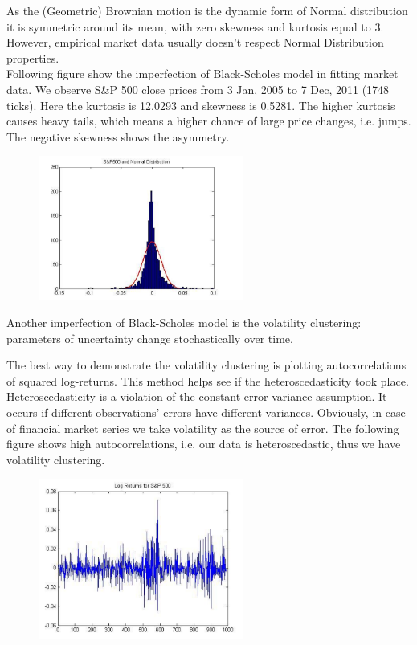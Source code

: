 \documentclass[a4paper]{report}
\begin{document}
\begin{itemize}
As the (Geometric) Brownian motion is the dynamic form of Normal distribution it is symmetric around its mean, with zero skewness and kurtosis
equal to 3. However, empirical market data usually doesn’t respect Normal Distribution
properties. \\
Following figure show the imperfection of Black-Scholes model in fitting market
data. We observe S\&P 500 close prices from 3 Jan, 2005 to 7 Dec, 2011 (1748 ticks). Here the kurtosis is 12.0293 and skewness is 0.5281. The higher kurtosis causes
heavy tails, which means a higher chance of large price changes, i.e. jumps. The
negative skewness shows the asymmetry. 

\begin{figure}[H]
    \centering
    \includegraphics[width=0.6\textwidth]{sp500.png}
\end{figure}


Another imperfection of Black-Scholes model is the
volatility clustering: parameters of uncertainty change stochastically over time.

The best way to demonstrate the volatility clustering is plotting autocorrelations of
squared log-returns. This method helps see if the heteroscedasticity took place.
Heteroscedasticity is a violation of the constant error variance assumption. It occurs
if different observations’ errors have different variances. Obviously, in case of
financial market series we take volatility as the source of error.
The following figure shows high autocorrelations, i.e. our data is heteroscedastic, thus we have volatility clustering.\\
\begin{figure}[H]
    \centering
    \includegraphics[width=0.6\textwidth]{log.png}
\end{figure}


\end{itemize}
\end{document}
